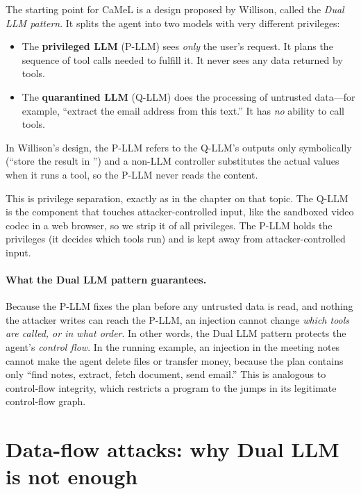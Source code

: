 The starting point for CaMeL is a design proposed by
Willison,\autocite{willison2023dualllm} called the \emph{Dual LLM
pattern}.
It splits the agent into two models with very different privileges:
\begin{itemize}
  \item The \textbf{privileged LLM} (P-LLM) sees \emph{only} the user's
    request. It plans the sequence of tool calls needed to fulfill it.
    It never sees any data returned by tools.
  \item The \textbf{quarantined LLM} (Q-LLM) does the processing of
    untrusted data---for example, ``extract the email address from this
    text.'' It has \emph{no} ability to call tools.
\end{itemize}
In Willison's design, the P-LLM refers to the Q-LLM's outputs only
symbolically (``store the result in '') and a non-LLM
controller substitutes the actual values when it runs a tool, so the
P-LLM never reads the content.

This is privilege separation, exactly as in the chapter on that topic.
The Q-LLM is the component that touches attacker-controlled input, like
the sandboxed video codec in a web browser, so we strip it of all
privileges.
The P-LLM holds the privileges (it decides which tools run) and is kept
away from attacker-controlled input.

\paragraph{What the Dual LLM pattern guarantees.}
Because the P-LLM fixes the plan before any untrusted data is read, and
nothing the attacker writes can reach the P-LLM, an injection cannot
change \emph{which tools are called, or in what order}.
In other words, the Dual LLM pattern protects the agent's
\emph{control flow}.
In the running example, an injection in the meeting notes cannot make
the agent delete files or transfer money, because the plan contains only
``find notes, extract, fetch document, send email.''
This is analogous to control-flow integrity, which restricts a program to
the jumps in its legitimate control-flow graph.

\section{Data-flow attacks: why Dual LLM is not enough}
\label{sec:camel:dataflow}

